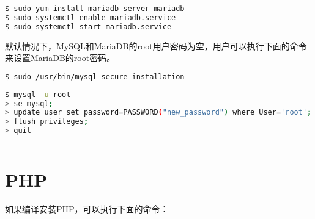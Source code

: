 \begin{lstlisting}[language=bash]
$ sudo yum install mariadb-server mariadb
$ sudo systemctl enable mariadb.service
$ sudo systemctl start mariadb.service
\end{lstlisting}


默认情况下，MySQL和MariaDB的root用户密码为空，用户可以执行下面的命令来设置MariaDB的root密码。

\begin{lstlisting}[language=bash]
$ sudo /usr/bin/mysql_secure_installation
\end{lstlisting}


\begin{lstlisting}[language=bash]
$ mysql -u root
> se mysql;
> update user set password=PASSWORD("new_password") where User='root';
> flush privileges;
> quit
\end{lstlisting}




\begin{lstlisting}[language=bash]

\end{lstlisting}

\section{PHP}

如果编译安装PHP，可以执行下面的命令：

